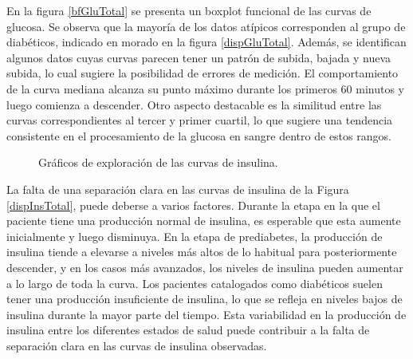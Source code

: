 En la figura \ref{bfGluTotal} se presenta un boxplot funcional de las curvas de glucosa. Se observa que la mayoría de los datos atípicos corresponden al grupo de diabéticos, indicado en morado en la figura \ref{dispGluTotal}. Además, se identifican algunos datos cuyas curvas parecen tener un patrón de subida, bajada y nueva subida, lo cual sugiere la posibilidad de errores de medición. El comportamiento de la curva mediana alcanza su punto máximo durante los primeros 60 minutos y luego comienza a descender. Otro aspecto destacable es la similitud entre las curvas correspondientes al tercer y primer cuartil, lo que sugiere una tendencia consistente en el procesamiento de la glucosa en sangre dentro de estos rangos.


\begin{figure}[H]
 \centering
    \caption{Gráficos de exploración de las curvas de insulina.}
    \label{fig:insulina}
\end{figure}

La falta de una separación clara en las curvas de insulina de la Figura \ref{dispInsTotal}, puede deberse a varios factores. Durante la etapa en la que el paciente tiene una producción normal de insulina, es esperable que esta aumente inicialmente y luego disminuya. En la etapa de prediabetes, la producción de insulina tiende a elevarse a niveles más altos de lo habitual para posteriormente descender, y en los casos más avanzados, los niveles de insulina pueden aumentar a lo largo de toda la curva. Los pacientes catalogados como diabéticos suelen tener una producción insuficiente de insulina, lo que se refleja en niveles bajos de insulina durante la mayor parte del tiempo. Esta variabilidad en la producción de insulina entre los diferentes estados de salud puede contribuir a la falta de separación clara en las curvas de insulina observadas.


